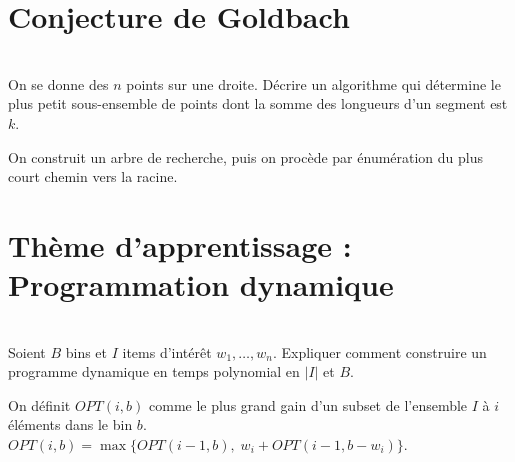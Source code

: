 \section{Conjecture de Goldbach}\label{sec:dm2-goldbach}

\begin{td-exo}\,\\
  On se donne des \(n\) points sur une droite. Décrire un algorithme
  qui détermine le plus petit sous-ensemble de points dont la somme
  des longueurs d'un segment est \(k\).
\end{td-exo}

\begin{td-sol}[]
  On construit un arbre de recherche, puis on procède par énumération
  du plus court chemin vers la racine.
\end{td-sol}

\section{Thème d'apprentissage : Programmation dynamique}\label{sec:dm2-dp}

\begin{td-exo}\,\\
  Soient \(B\) bins et \(I\) items d'intérêt \(w_1, \dots, w_n\).
  Expliquer comment construire un programme dynamique en temps polynomial
  en \(|I|\) et \(B\).
\end{td-exo}

\begin{td-sol}[]
  On définit \(OPT(i, b)\) comme le plus grand gain d'un subset de
  l'ensemble \(I\) à \(i\) éléments dans le bin \(b\).
  \(OPT(i, b) = \max\{ OPT(i-1, b), \; w_i + OPT(i-1, b - w_i) \}\).
\end{td-sol}
